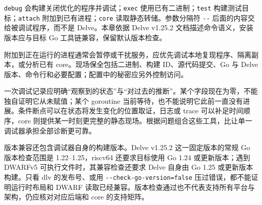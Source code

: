 \documentclass[UTF8,fontset=fandol,openany,11pt]{ctexbook}
\begin{document}
\texttt{debug} 会构建关闭优化的程序并调试；\texttt{exec} 使用已有二进制；\texttt{test} 构建测试目标；\texttt{attach} 附加到已有进程；\texttt{core} 读取静态转储。参数分隔符 \texttt{-\allowbreak{}-\allowbreak{}} 后面的内容交给被调试程序，而不是 Delve。本章依据 Delve v1.25.2 文档描述命令语义，安装版本应与目标 Go 工具链兼容，保留默认版本检查。\cite{tools-delve-debug}\cite{tools-delve-exec}\cite{tools-delve-core}

附加到正在运行的进程通常会暂停或干扰服务，应优先调试本地复现程序、隔离副本，或分析已有 core。现场保全包括二进制、构建 ID、源代码提交、Go 与 Delve 版本、命令行和必要配置；配置中的秘密应另外控制访问。

一次调试记录应明确“观察到的状态”与“对过去的推断”。某个字段现在为零，不能独自证明它从未赋值；某个 goroutine 当前等待，也不能说明它此前一直没有进展。条件断点可以在状态将发生变化的位置取证，日志或 trace 可以补足时间顺序，core 则提供某一时刻更完整的静态现场。根据问题组合这些工具，比让单一调试器承担全部诊断更可靠。

版本兼容还包含调试器自身的构建版本。Delve v1.25.2 这一固定版本的常规 Go 版本检查范围是 1.22–1.25，riscv64 还要求目标使用 Go 1.24 或更新版本；遇到 DWARFv5 可执行文件时，其兼容检查还要求 Delve 自身由 Go 1.25 或更新版本构建。只看 dlv 的发布号、或用 \texttt{-\allowbreak{}-\allowbreak{}check-\allowbreak{}go-\allowbreak{}version=false} 压过错误，都不能证明运行时布局和 DWARF 读取已经兼容。版本检查通过也不代表支持所有平台与架构，仍应核对对应后端和 core 的支持矩阵。\cite{tools-delve-compat}
\end{document}
